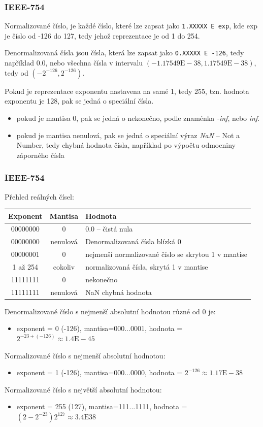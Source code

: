 \begin{frame}
\frametitle{IEEE-754}

Normalizované číslo, je každé číslo, které lze zapsat jako \texttt{1.XXXXX E exp}, kde exp je číslo od -126 do 127, tedy jehož reprezentace je od 1 do 254.

\bigskip
Denormalizovaná čísla jsou čísla, která lze zapsat jako \texttt{0.XXXXX E -126}, tedy například 0.0, nebo všechna čísla v intervalu $(-1.17549\text{E}-38,1.17549\text{E}-38)$, tedy od $(-2^{-126},2^{-126})$.

\bigskip
Pokud je reprezentace exponentu nastavena na samé 1, tedy 255, tzn. hodnota exponentu je 128, pak se jedná o speciální čísla. 
\begin{itemize}
\item pokud je mantisa 0, pak se jedná o nekonečno, podle znaménka \textit{-inf}, nebo \textit{inf}.
\item pokud je mantisa nenulová, pak se jedná o speciální výraz \textit{NaN} -- Not a Number, tedy chybná hodnota čísla, například po výpočtu odmocniny záporného čísla 
\end{itemize}
\end{frame}

\begin{frame}[shrink=5]
\frametitle{IEEE-754}

Přehled reálných čísel:
\begin{tabular}{|c|c|l|}\hline
Exponent & Mantisa &  Hodnota \\ \hline
00000000 & 0 &  0.0 -- čistá nula \\ \hline
00000000 & nenulová &  Denormalizovaná čísla blízká 0 \\ \hline
00000001 & 0 &  nejmenší normalizované číslo se skrytou 1 v mantise \\ \hline
\small 1 až 254 & cokoliv &  normalizovaná čísla, skrytá 1 v mantise \\ \hline
11111111 & 0 &  nekonečno \\ \hline
11111111 & nenulová &  NaN chybná hodnota \\ \hline
\end{tabular}
\bigskip

Denormalizované číslo s nejmenší absolutní hodnotou různé od 0 je:
\begin{itemize}
\item \small exponent = 0 (-126), mantisa=000...0001, hodnota = $2^{-23+(-126)} \approx 1.4\text{E}-45$
\end{itemize}
Normalizované číslo s nejmenší absolutní hodnotou:
\begin{itemize}
\item \small exponent = 1 (-126), mantisa=000...0000, hodnota = $2^{-126} \approx 1.17\text{E}-38$
\end{itemize}
Normalizované číslo s největší absolutní hodnotou:
\begin{itemize}
\item \small exponent = 255 (127), mantisa=111...1111, hodnota = $(2-2^{-23})2^{127} \approx 3.4\text{E}38$
\end{itemize}
\end{frame}


